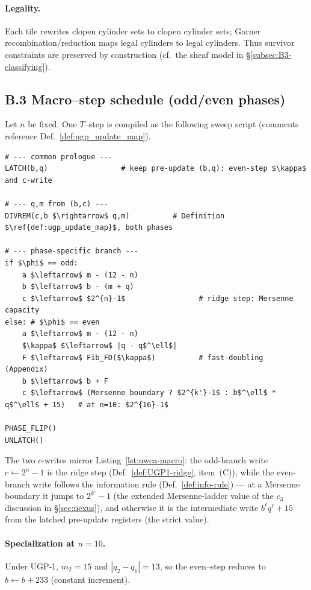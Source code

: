 \documentclass[12pt]{article}
\numberwithin{equation}{section}
\begin{document}
\paragraph{Legality.} Each tile rewrites clopen cylinder sets to clopen cylinder sets; Garner recombination/reduction maps legal cylinders to legal cylinders. Thus survivor constraints are preserved by construction (cf.\ the sheaf model in §\ref{subsec:B3-classifying}).

\subsection*{B.3  Macro–step schedule (odd/even phases)}
Let \(n\) be fixed. One \(T\)–step is compiled as the following sweep script (comments reference Def.~\ref{def:ugp_update_map}).

\begin{lstlisting}[mathescape=true,basicstyle=\ttfamily\small]
# --- common prologue ---
LATCH(b,q)                 # keep pre-update (b,q): even-step $\kappa$ and c-write

# --- q,m from (b,c) ---
DIVREM(c,b $\rightarrow$ q,m)          # Definition $\ref{def:ugp_update_map}$, both phases

# --- phase-specific branch ---
if $\phi$ == odd:
    a $\leftarrow$ m - (12 - n)
    b $\leftarrow$ b - (m + q)
    c $\leftarrow$ $2^{n}-1$                 # ridge step: Mersenne capacity
else: # $\phi$ == even
    a $\leftarrow$ m - (12 - n)
    $\kappa$ $\leftarrow$ |q - q$^\ell$|
    F $\leftarrow$ Fib_FD($\kappa$)          # fast-doubling (Appendix)
    b $\leftarrow$ b + F
    c $\leftarrow$ (Mersenne boundary ? $2^{k'}-1$ : b$^\ell$ * q$^\ell$ + 15)   # at n=10: $2^{16}-1$

PHASE_FLIP()
UNLATCH()
\end{lstlisting}

\noindent
The two $c$-writes mirror Listing~\ref{lst:uwca-macro}: the odd-branch write $c\leftarrow 2^{n}-1$ is the ridge step (Def.~\ref{def:UGP1-ridge}, item~(C)), while the even-branch write follows the information rule (Def.~\ref{def:info-rule}) --- at a Mersenne boundary it jumps to $2^{k'}-1$ (the extended Mersenne-ladder value of the $c_3$ discussion in \S\ref{sec:nexus}), and otherwise it is the intermediate write $b^\ell q^\ell+15$ from the latched pre-update registers (the strict value).

\paragraph{Specialization at \(n=10\).} Under UGP‑1, \(m_2{=}15\) and \(|q_2{-}q_1|{=}13\), so the even–step reduces to \(b\leftarrow b+233\) (constant increment).
\end{document}
